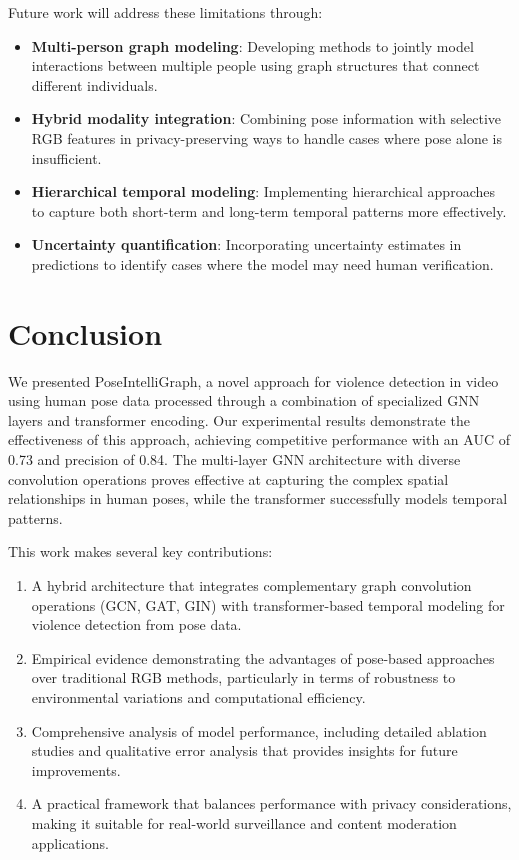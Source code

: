 \documentclass[conference]{IEEEtran}
\begin{document}
Future work will address these limitations through:

\begin{itemize}
    \item \textbf{Multi-person graph modeling}: Developing methods to jointly model interactions between multiple people using graph structures that connect different individuals.

    \item \textbf{Hybrid modality integration}: Combining pose information with selective RGB features in privacy-preserving ways to handle cases where pose alone is insufficient.

    \item \textbf{Hierarchical temporal modeling}: Implementing hierarchical approaches to capture both short-term and long-term temporal patterns more effectively.

    \item \textbf{Uncertainty quantification}: Incorporating uncertainty estimates in predictions to identify cases where the model may need human verification.
\end{itemize}

\section{Conclusion}
We presented PoseIntelliGraph, a novel approach for violence detection in video
using human pose data processed through a combination of specialized GNN layers
and transformer encoding. Our experimental results demonstrate the
effectiveness of this approach, achieving competitive performance with an AUC
of 0.73 and precision of 0.84. The multi-layer GNN architecture with diverse
convolution operations proves effective at capturing the complex spatial
relationships in human poses, while the transformer successfully models
temporal patterns.

This work makes several key contributions:

\begin{enumerate}
    \item A hybrid architecture that integrates complementary graph convolution
          operations (GCN, GAT, GIN) with transformer-based temporal modeling for
          violence detection from pose data.

    \item Empirical evidence demonstrating the advantages of pose-based approaches over
          traditional RGB methods, particularly in terms of robustness to environmental
          variations and computational efficiency.

    \item Comprehensive analysis of model performance, including detailed ablation
          studies and qualitative error analysis that provides insights for future
          improvements.

    \item A practical framework that balances performance with privacy considerations,
          making it suitable for real-world surveillance and content moderation
          applications.
\end{enumerate}
\end{document}
